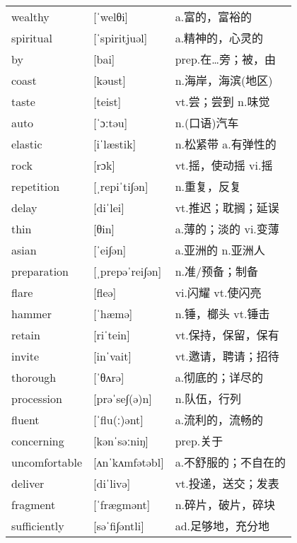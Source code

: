 \documentclass[a4paper]{article}
\begin{document}
\section{}
\begin{tabular}{l l l}

wealthy & [ˈwelθi] & a.富的，富裕的 \\
spiritual & [ˈspiritjuəl] & a.精神的，心灵的 \\
by & [bai] & prep.在…旁；被，由 \\
coast & [kəust] & n.海岸，海滨(地区) \\
taste & [teist] & vt.尝；尝到 n.味觉 \\
auto & [ˈɔːtəu] & n.(口语)汽车 \\
elastic & [iˈlæstik] & n.松紧带 a.有弹性的 \\
rock & [rɔk] & vt.摇，使动摇 vi.摇 \\
repetition & [ˌrepiˈti∫ən] & n.重复，反复 \\
delay & [diˈlei] & vt.推迟；耽搁；延误 \\
thin & [θin] & a.薄的；淡的 vi.变薄 \\
asian & [ˈei∫ən] & a.亚洲的 n.亚洲人 \\
preparation & [ˌprepəˈrei∫ən] & n.准/预备；制备 \\
flare & [fleə] & vi.闪耀 vt.使闪亮 \\
hammer & [ˈhæmə] & n.锤，榔头 vt.锤击 \\
retain & [riˈtein] & vt.保持，保留，保有 \\
invite & [inˈvait] & vt.邀请，聘请；招待 \\
thorough & [ˈθʌrə] & a.彻底的；详尽的 \\
procession & [prəˈse∫(ə)n] & n.队伍，行列 \\
fluent & [ˈflu(ː)ənt] & a.流利的，流畅的 \\
concerning & [kənˈsəːniŋ] & prep.关于 \\
uncomfortable & [ʌnˈkʌmfətəbl] & a.不舒服的；不自在的 \\
deliver & [diˈlivə] & vt.投递，送交；发表 \\
fragment & [ˈfrægmənt] & n.碎片，破片，碎块 \\
sufficiently & [səˈfi∫əntli] & ad.足够地，充分地 \\

\end{tabular}
\end{document}
